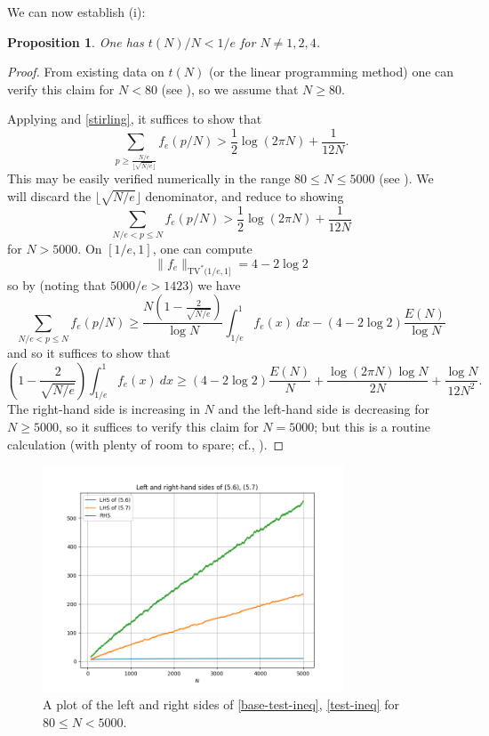 \documentclass[12pt,a4paper,reqno]{amsart}
\numberwithin{equation}{section}
\theoremstyle{plain}
\newtheorem{proposition}[theorem]{Proposition}
\theoremstyle{definition}
\begin{document}
We can now establish (i): 

\begin{proposition}\label{tne} One has $t(N)/N < 1/e$ for $N \neq 1,2,4$.
\end{proposition}

\begin{proof}  From existing data on $t(N)$ (or the linear programming method) one can verify this claim for $N < 80$ (see ), so we assume that $N\geq 80$.
  
Applying  and \eqref{stirling}, it suffices to show that
\begin{equation}\label{base-test-ineq}
   \sum_{p \geq \frac{N/e}{\lfloor\sqrt{N/e}\rfloor}} f_{e}(p/N) > \frac{1}{2} \log(2\pi N) + \frac{1}{12N}.
\end{equation}
This may be easily verified numerically in the range $80 \leq N \leq 5000$ (see ).
We will discard the $\lfloor\sqrt{N/e}\rfloor$ denominator, and reduce to showing
\begin{equation}\label{test-ineq}
  \sum_{N/e < p \leq N} f_{e}(p/N) > \frac{1}{2} \log(2\pi N) + \frac{1}{12N}
\end{equation}
for $N > 5000$.  On $[1/e,1]$, one can compute
$$ \|f_e\|_{\mathrm{TV}^*(1/e,1]}
= 4 - 2 \log 2$$
so by  (noting that $5000/e > 1423$) we have
$$ \sum_{N/e < p \leq N} f_{e}(p/N) 
\geq \frac{N \left(1-\frac{2}{\sqrt{N/e}}\right)}{\log N} \int_{1/e}^1 f_e(x)\ dx - (4 - 2 \log 2) \frac{E(N)}{\log N}
$$
and so it suffices to show that
$$ \left(1 - \frac{2}{\sqrt{N/e}}\right) \int_{1/e}^1 f_e(x)\ dx \geq
(4 - 2 \log 2) \frac{E(N)}{N}
+ \frac{\log(2\pi N) \log N}{2N} + \frac{\log N}{12N^2}.$$
The right-hand side is increasing in $N$ and the left-hand side is decreasing for $N \geq 5000$, so it suffices to verify this claim for $N=5000$; but this is a routine calculation (with plenty of room to spare; cf., ).
\end{proof}

\begin{figure}
  \centering
  \includegraphics[width=0.8\textwidth]{lhs_rhs.png}
  \vspace{-8pt}
  \caption{A plot of the left and right sides of \eqref{base-test-ineq}, \eqref{test-ineq} for $80 \leq N < 5000$.}\label{fig2}
\end{figure}
\end{document}
